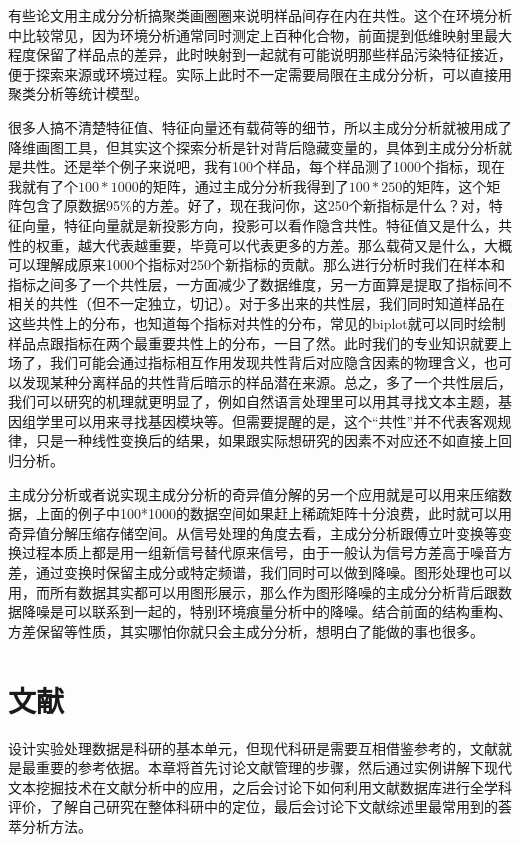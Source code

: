 \documentclass[]{tufte-book}
\begin{document}
有些论文用主成分分析搞聚类画圈圈来说明样品间存在内在共性。这个在环境分析中比较常见，因为环境分析通常同时测定上百种化合物，前面提到低维映射里最大程度保留了样品点的差异，此时映射到一起就有可能说明那些样品污染特征接近，便于探索来源或环境过程。实际上此时不一定需要局限在主成分分析，可以直接用聚类分析等统计模型。

很多人搞不清楚特征值、特征向量还有载荷等的细节，所以主成分分析就被用成了降维画图工具，但其实这个探索分析是针对背后隐藏变量的，具体到主成分分析就是共性。还是举个例子来说吧，我有100个样品，每个样品测了1000个指标，现在我就有了个\(100*1000\)的矩阵，通过主成分分析我得到了\(100*250\)的矩阵，这个矩阵包含了原数据95\%的方差。好了，现在我问你，这250个新指标是什么？对，特征向量，特征向量就是新投影方向，投影可以看作隐含共性。特征值又是什么，共性的权重，越大代表越重要，毕竟可以代表更多的方差。那么载荷又是什么，大概可以理解成原来1000个指标对250个新指标的贡献。那么进行分析时我们在样本和指标之间多了一个共性层，一方面减少了数据维度，另一方面算是提取了指标间不相关的共性（但不一定独立，切记）。对于多出来的共性层，我们同时知道样品在这些共性上的分布，也知道每个指标对共性的分布，常见的biplot就可以同时绘制样品点跟指标在两个最重要共性上的分布，一目了然。此时我们的专业知识就要上场了，我们可能会通过指标相互作用发现共性背后对应隐含因素的物理含义，也可以发现某种分离样品的共性背后暗示的样品潜在来源。总之，多了一个共性层后，我们可以研究的机理就更明显了，例如自然语言处理里可以用其寻找文本主题，基因组学里可以用来寻找基因模块等。但需要提醒的是，这个``共性''并不代表客观规律，只是一种线性变换后的结果，如果跟实际想研究的因素不对应还不如直接上回归分析。

主成分分析或者说实现主成分分析的奇异值分解的另一个应用就是可以用来压缩数据，上面的例子中100*1000的数据空间如果赶上稀疏矩阵十分浪费，此时就可以用奇异值分解压缩存储空间。从信号处理的角度去看，主成分分析跟傅立叶变换等变换过程本质上都是用一组新信号替代原来信号，由于一般认为信号方差高于噪音方差，通过变换时保留主成分或特定频谱，我们同时可以做到降噪。图形处理也可以用，而所有数据其实都可以用图形展示，那么作为图形降噪的主成分分析背后跟数据降噪是可以联系到一起的，特别环境痕量分析中的降噪。结合前面的结构重构、方差保留等性质，其实哪怕你就只会主成分分析，想明白了能做的事也很多。

\hypertarget{lib}{%
\chapter{文献}\label{lib}}

设计实验处理数据是科研的基本单元，但现代科研是需要互相借鉴参考的，文献就是最重要的参考依据。本章将首先讨论文献管理的步骤，然后通过实例讲解下现代文本挖掘技术在文献分析中的应用，之后会讨论下如何利用文献数据库进行全学科评价，了解自己研究在整体科研中的定位，最后会讨论下文献综述里最常用到的荟萃分析方法。
\end{document}
